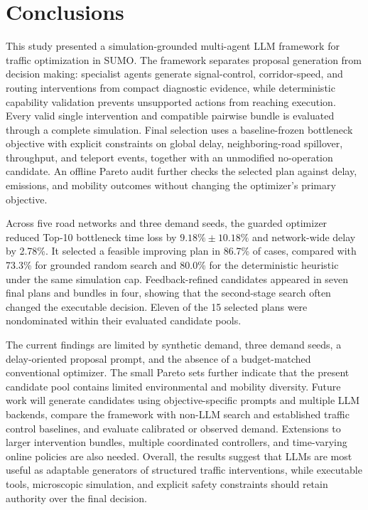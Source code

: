 \section{Conclusions}
\label{sec:conclusion}

This study presented a simulation-grounded multi-agent LLM framework for
traffic optimization in SUMO.  The framework separates proposal generation
from decision making: specialist agents generate signal-control,
corridor-speed, and routing interventions from compact diagnostic evidence,
while deterministic capability validation prevents unsupported actions from
reaching execution.  Every valid single intervention and compatible pairwise
bundle is evaluated through a complete simulation.  Final selection uses a
baseline-frozen bottleneck objective with explicit constraints on global delay,
neighboring-road spillover, throughput, and teleport events, together with an
unmodified no-operation candidate.  An offline Pareto audit further checks the
selected plan against delay, emissions, and mobility outcomes without changing
the optimizer's primary objective.

Across five road networks and three demand seeds, the guarded optimizer reduced
Top-10 bottleneck time loss by $9.18\%\pm10.18\%$ and network-wide delay by
2.78\%.  It selected a feasible improving plan in 86.7\% of cases, compared
with 73.3\% for grounded random search and 80.0\% for the deterministic
heuristic under the same simulation cap.  Feedback-refined candidates appeared
in seven final plans and bundles in four, showing that the second-stage search
often changed the executable decision.  Eleven of the 15 selected plans were
nondominated within their evaluated candidate pools.

The current findings are limited by synthetic demand, three demand seeds, a
delay-oriented proposal prompt, and the absence of a budget-matched conventional
optimizer.  The small Pareto sets further indicate that the present candidate
pool contains limited environmental and mobility diversity.  Future work will
generate candidates using objective-specific prompts and multiple LLM
backends, compare the framework with non-LLM search and established traffic
control baselines, and evaluate calibrated or observed demand.  Extensions to
larger intervention bundles, multiple coordinated controllers, and time-varying
online policies are also needed.  Overall, the results suggest that LLMs are
most useful as adaptable generators of structured traffic interventions, while
executable tools, microscopic simulation, and explicit safety constraints
should retain authority over the final decision.
